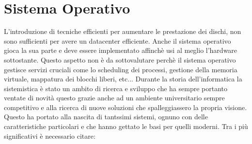 \section{Sistema Operativo}
L'introduzione di tecniche efficienti per aumentare le prestazione dei dischi, non sono sufficienti per avere un datacenter efficiente. Anche il sistema operativo gioca la sua parte e deve essere implementato affinchè usi al meglio l'hardware sottostante. Questo aspetto non è da sottovalutare perchè il sistema operativo gestisce servizi cruciali come lo scheduling dei processi, gestione della memoria virtuale, mappatura dei blocchi liberi, etc... Durante la storia dell'informatica la sistemistica è stato un ambito di ricerca e sviluppo che ha sempre portanto ventate di novità questo grazie anche ad un ambiente universitario sempre competitivo e alla ricerca di nuove soluzioni che spalleggiassero la propria visione. Questo ha portato alla nascita di tantssimi sistemi, ognuno con delle caratteristiche particolari e che hanno gettato le basi per quelli moderni. Tra i più significativi è necessario citare:
